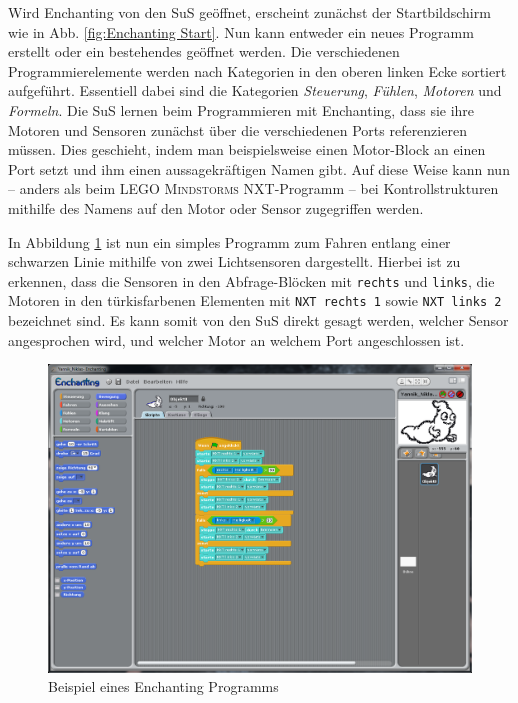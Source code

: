 \documentclass[paper=a4, DIV=calc, BCOR=15mm, twoside=on, onecolumn=on, open = right, titlepage =on, parskip =half, headsepline = on, footsepline = on, chapterprefix = off, appendixprefix = off, fontsize = 12pt, numbers = noenddot, abstract = on]{scrbook}
\begin{document}
\clearpage
Wird Enchanting von den SuS geöffnet, erscheint zunächst der Startbildschirm wie in Abb. \ref{fig:Enchanting Start}. Nun kann entweder ein neues Programm erstellt oder ein bestehendes geöffnet werden. Die verschiedenen Programmierelemente werden nach Kategorien in den oberen linken Ecke sortiert aufgeführt. Essentiell dabei sind die Kategorien \emph{Steuerung}, \emph{Fühlen}, \emph{Motoren} und \emph{Formeln}. Die SuS lernen beim Programmieren mit Enchanting, dass sie ihre Motoren und Sensoren zunächst über die verschiedenen Ports referenzieren müssen. Dies geschieht, indem man beispielsweise einen Motor-Block an einen Port setzt und ihm einen aussagekräftigen Namen gibt. Auf diese Weise kann nun -- anders als beim \textsc{LEGO Mindstorms} NXT-Programm -- bei Kontrollstrukturen mithilfe des Namens auf den Motor oder Sensor zugegriffen werden.

In Abbildung \ref{fig:Bsp Enchanting} ist nun ein simples Programm zum Fahren entlang einer schwarzen Linie mithilfe von zwei Lichtsensoren dargestellt. Hierbei ist zu erkennen, dass die Sensoren in den Abfrage-Blöcken mit \texttt{rechts} und \texttt{links}, die Motoren in den türkisfarbenen Elementen mit \texttt{NXT rechts 1} sowie \texttt{NXT links 2} bezeichnet sind. Es kann somit von den SuS direkt gesagt werden, welcher Sensor angesprochen wird, und welcher Motor an welchem Port angeschlossen ist.

\vspace*{2cm}

\begin{figure}[htbp]
\centering
\includegraphics[width=\textwidth]{images/Beispielprogramm_Enchanting.png} 
\caption{Beispiel eines Enchanting Programms}
\label{fig:Bsp Enchanting}
\end{figure}
\end{document}
